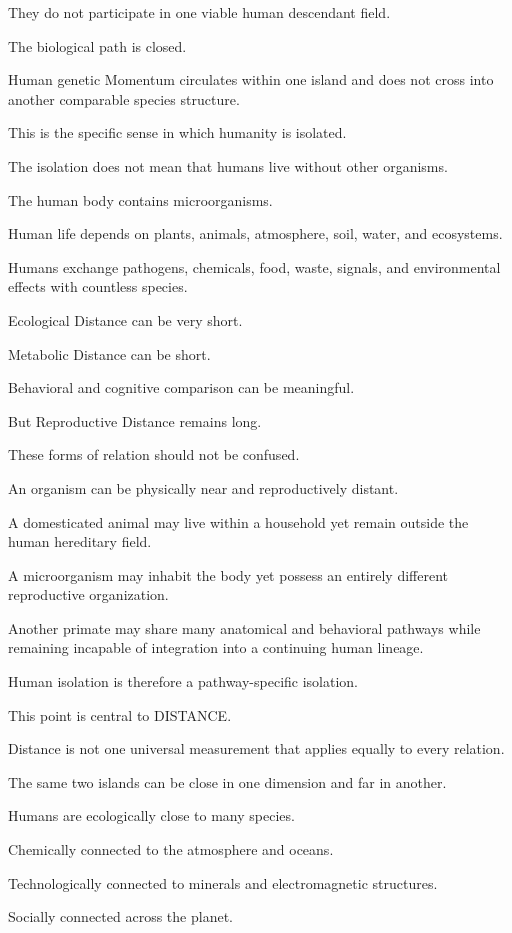 They do not participate in one viable human descendant field.

The biological path is closed.

Human genetic Momentum circulates within one island and does not cross into another comparable species structure.

This is the specific sense in which humanity is isolated.

The isolation does not mean that humans live without other organisms.

The human body contains microorganisms.

Human life depends on plants, animals, atmosphere, soil, water, and ecosystems.

Humans exchange pathogens, chemicals, food, waste, signals, and environmental effects with countless species.

Ecological Distance can be very short.

Metabolic Distance can be short.

Behavioral and cognitive comparison can be meaningful.

But Reproductive Distance remains long.

These forms of relation should not be confused.

An organism can be physically near and reproductively distant.

A domesticated animal may live within a household yet remain outside the human hereditary field.

A microorganism may inhabit the body yet possess an entirely different reproductive organization.

Another primate may share many anatomical and behavioral pathways while remaining incapable of integration into a continuing human lineage.

Human isolation is therefore a pathway-specific isolation.

This point is central to DISTANCE.

Distance is not one universal measurement that applies equally to every relation.

The same two islands can be close in one dimension and far in another.

Humans are ecologically close to many species.

Chemically connected to the atmosphere and oceans.

Technologically connected to minerals and electromagnetic structures.

Socially connected across the planet.

